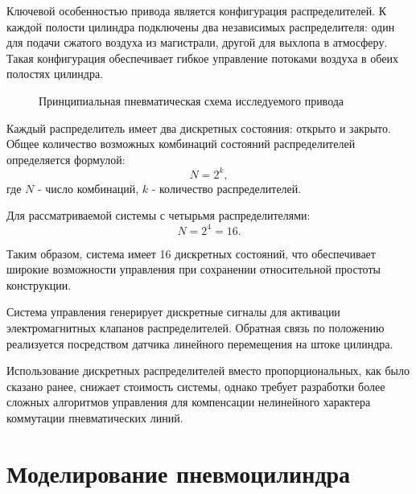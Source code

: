 Ключевой особенностью привода является конфигурация распределителей.
К каждой полости цилиндра подключены два независимых распределителя:
один для подачи сжатого воздуха из магистрали, другой для выхлопа в атмосферу.
Такая конфигурация обеспечивает гибкое управление потоками воздуха в обеих полостях цилиндра.

\begin{figure}[h]
    \caption{Принципиальная пневматическая схема исследуемого привода}
    \label{fig:ch2/pneumatic_actuator_scheme}
    
\end{figure}

Каждый распределитель имеет два дискретных состояния: открыто и закрыто.
Общее количество возможных комбинаций состояний распределителей
определяется формулой:
\begin{equation*}
    N = 2^k,
\end{equation*}
где $N$ - число комбинаций, $k$ - количество распределителей.

Для рассматриваемой системы с четырьмя распределителями:
\begin{equation*}
    N = 2^4 = 16.
\end{equation*}

Таким образом, система имеет 16 дискретных состояний, что обеспечивает широкие возможности
управления при сохранении относительной простоты конструкции.

Система управления генерирует дискретные сигналы для активации
электромагнитных клапанов распределителей. Обратная связь по положению реализуется посредством датчика линейного перемещения на штоке цилиндра. 

Использование дискретных распределителей вместо пропорциональных, как было сказано ранее,
снижает стоимость системы, однако требует разработки более сложных
алгоритмов управления для компенсации нелинейного характера коммутации пневматических линий.

\section{Моделирование пневмоцилиндра}\label{sec:ch2/sec2}


